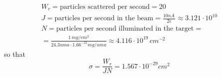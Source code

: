 \begin{gather*}
    W_r = \text{particles scattered per second} = 20 \\
    J = \text{particles per second in the beam} = \frac{10nA \, }{2e} \approx 3.121 \cdot 10^{10} \\
    N = \text{particles per second illuminated in the target} = \\ 
    = \frac{1 \, mg/cm^2}{24.3uma \cdot 1.66^{-21} mg/uma} \approx 4.116 \cdot 10^{19} \, cm^{-2}
\end{gather*}
so that $$\sigma = \frac{W_r}{J N} = 1.567 \cdot 10^{-29} cm^2$$